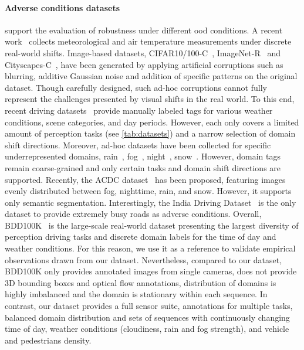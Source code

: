 \paragraph{Adverse conditions datasets} support the evaluation of robustness under different \ac{ood} conditions.
A recent work~\cite{malinin2021shifts} collects meteorological and air temperature measurements under discrete real-world shifts.
Image-based datasets, \eg{}  CIFAR10/100-C~\cite{michaelis2019benchmarking}, ImageNet-R~\cite{hendrycks2021many} and Cityscapes-C~\cite{hendrycks2019robustness}, have been generated by applying artificial corruptions such as blurring, additive Gaussian noise and addition of specific patterns on the original dataset. Though carefully designed, such ad-hoc corruptions cannot fully represent the challenges presented by visual shifts in the real world.
To this end, recent driving datasets~\cite{pham2020a3d, bdd100k, caesar2020nuscenes, sun2020scalability,mao2021one} provide manually labeled tags for various weather conditions, scene categories, and day periods. 
However, each only covers a limited amount of perception tasks (see \autoref{tab:datasets}) and a narrow selection of domain shift directions. 
Moreover, ad-hoc datasets have been collected for specific underrepresented domains, \eg{} rain~\cite{tung2017raincouver,jin2021raidar}, fog~\cite{tarel2012vision,sakaridis2018semantic,sakaridis2018model}, night~\cite{dai2018dark}, snow~\cite{pitropov2021canadian}.
However, domain tags remain coarse-grained and only certain tasks and domain shift directions are supported.
Recently, the ACDC dataset~\cite{sakaridis2021acdc} has been proposed, featuring images evenly distributed between fog, nighttime, rain, and snow. However, it supports only semantic segmentation.
Interestingly, the India Driving Dataset~\cite{varma2019idd} is the only dataset to provide extremely busy roads as adverse conditions.
Overall, BDD100K~\cite{bdd100k} is the large-scale real-world dataset presenting the largest diversity of perception driving tasks and discrete domain labels for the time of day and weather conditions.
For this reason, we use it as a reference to validate empirical observations drawn from our dataset.
Nevertheless, compared to our dataset, BDD100K only provides annotated images from single cameras, does not provide 3D bounding boxes and optical flow annotations, distribution of domains is highly imbalanced and the domain is stationary within each sequence.
In contrast, our dataset provides a full sensor suite, annotations for multiple tasks, balanced domain distribution and sets of sequences with continuously changing time of day, weather conditions (cloudiness, rain and fog strength), and vehicle and pedestrians density.

